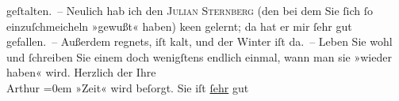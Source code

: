 \begin{ledgroupsized}[t]{13cm}
               geſtalten. – Neulich hab ich den \textsc{Julian Sternberg} (den bei dem Sie ſich ſo einzuſchmeicheln »gewußt« haben) ke{\geminationn}en gelernt; da hat er mir ſehr gut gefallen. –\pend
           \pstart
           {\pb}Außerdem regnets, iſt kalt, und der Winter iſt
               da. –\pend
           \pstart
           Leben Sie wohl und ſchreiben Sie einem doch wenigſtens endlich einmal, wann man sie
               »wieder haben« wird.\pend
           \pstart
           Herzlich der Ihre{\\[\baselineskip]}\spacefill\mbox{Arthur}\pend
           \leftskip=0em{}\pstart
           \noindent{}»Zeit« wird beſorgt. Sie iſt \uline{ſehr} gut\pend
           
         
         \endnumbering{}\end{ledgroupsized}  \newcommand{\dateiname}{L00382}\newcommand{\titel}{Arthur Schnitzler an Richard Beer-Hofmann, 15. 10. 1894}\newcommand{\editorInnen}{Martin Anton Müller und Gerd-Hermann Susen}
      